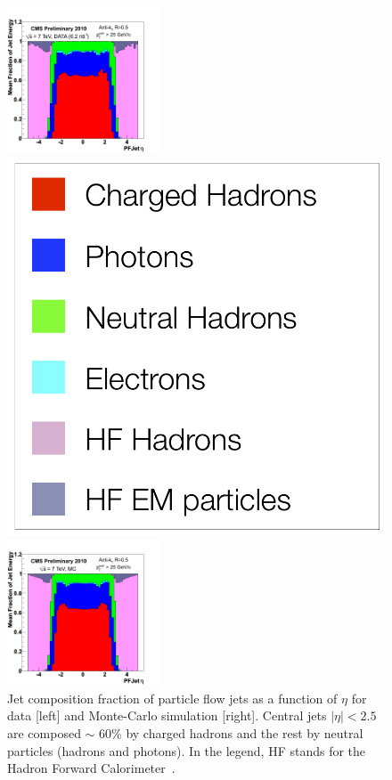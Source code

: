  \begin{figure}[!Hhtbp]
  \begin{center}
    \includegraphics[width=0.4\textwidth]{figs/Jet_composition_data_7TeV.png}
    \begin{minipage}[t]{.15\textwidth}
      \centering
      \includegraphics[width=1.0\textwidth]{figs/Legend_jet_composition.png}
    \end{minipage}
    \includegraphics[width=0.4\textwidth]{figs/Jet_composition_MC_7TeV.png}
    \caption{Jet composition fraction of particle flow jets as a function of $\eta$ for data [left] and Monte-Carlo simulation [right]. Central jets $|\eta|<2.5$ are composed $\sim$ 60\% by charged hadrons and the rest by neutral particles (hadrons and photons). In the legend, HF stands for the Hadron Forward Calorimeter~\cite{Beaudette:2014cea}.}
    \label{fig:PFJets}
  \end{center}
\end{figure}

